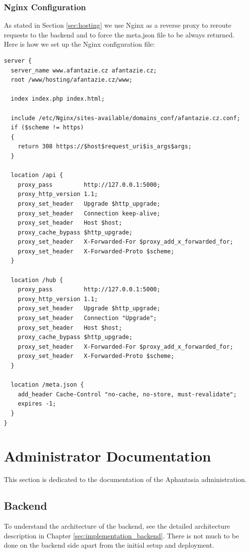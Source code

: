 \subsubsection{Nginx Configuration}
\label{sec:nginx_config}
As stated in Section \ref{sec:hosting} we use Nginx as a reverse proxy to reroute requests to the backend and to force the meta.json file to be always returned.
Here is how we set up the Nginx configuration file:
\begin{lstlisting}
server {
  server_name www.afantazie.cz afantazie.cz;
  root /www/hosting/afantazie.cz/www;

  index index.php index.html;

  include /etc/Nginx/sites-available/domains_conf/afantazie.cz.conf;
  if ($scheme != https)
  {
    return 308 https://$host$request_uri$is_args$args;
  }

  location /api {
    proxy_pass         http://127.0.0.1:5000;
    proxy_http_version 1.1;
    proxy_set_header   Upgrade $http_upgrade;
    proxy_set_header   Connection keep-alive;
    proxy_set_header   Host $host;
    proxy_cache_bypass $http_upgrade;
    proxy_set_header   X-Forwarded-For $proxy_add_x_forwarded_for;
    proxy_set_header   X-Forwarded-Proto $scheme;
  }

  location /hub {
    proxy_pass         http://127.0.0.1:5000;
    proxy_http_version 1.1;
    proxy_set_header   Upgrade $http_upgrade;
    proxy_set_header   Connection "Upgrade";
    proxy_set_header   Host $host;
    proxy_cache_bypass $http_upgrade;
    proxy_set_header   X-Forwarded-For $proxy_add_x_forwarded_for;
    proxy_set_header   X-Forwarded-Proto $scheme;
  }

  location /meta.json {
    add_header Cache-Control "no-cache, no-store, must-revalidate";
    expires -1;
  }
}
\end{lstlisting}

\section{Administrator Documentation}
This section is dedicated to the documentation of the Aphantasia administration.

\subsection{Backend}
To understand the architecture of the backend, see the detailed architecture description in Chapter \ref{sec:implementation_backend}.
There is not much to be done on the backend side apart from the initial setup and deployment.

